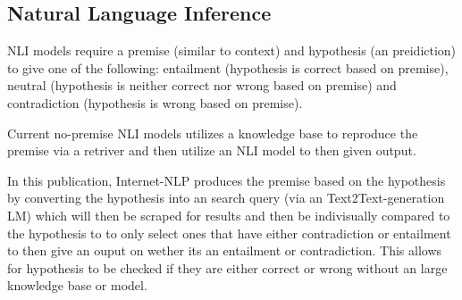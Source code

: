 \subsection{Natural Language Inference}

NLI models require a premise (similar to context) and hypothesis (an preidiction) to give one of the following: entailment (hypothesis is correct based on premise), neutral (hypothesis is neither correct nor wrong based on premise) and contradiction (hypothesis is wrong based on premise).

Current no-premise NLI models utilizes a knowledge base to reproduce the premise via a retriver and then utilize an NLI model to then given output.

In this publication, Internet-NLP produces the premise based on the hypothesis by converting the hypothesis into an search query (via an Text2Text-generation LM) which will then be scraped for results and then be indivisually compared to the hypothesis to to only select ones that have either contradiction or entailment to then give an ouput on wether its an entailment or contradiction. This allows for hypothesis to be checked if they are either correct or wrong without an large knowledge base or model.
